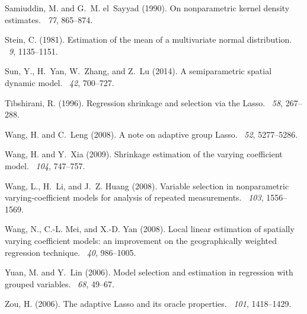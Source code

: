 \documentclass[authoryear,review, 12pt]{elsarticle}
\begin{document}
\begin{thebibliography}{}
Samiuddin, M. and G.~M. el~Sayyad (1990).
\newblock On nonparametric kernel density estimates.
~{\em 77}, 865--874.

Stein, C. (1981).
\newblock Estimation of the mean of a multivariate normal distribution.
~{\em 9}, 1135--1151.

Sun, Y., H.~Yan, W.~Zhang, and Z.~Lu (2014).
\newblock A semiparametric spatial dynamic model.
~{\em 42}, 700--727.

Tibshirani, R. (1996).
\newblock Regression shrinkage and selection via the {L}asso.
~{\em 58},
  267--288.

Wang, H. and C.~Leng (2008).
\newblock A note on adaptive group {L}asso.
~{\em 52},
  5277--5286.

Wang, H. and Y.~Xia (2009).
\newblock Shrinkage estimation of the varying coefficient model.
~{\em 104},
  747--757.

Wang, L., H.~Li, and J.~Z. Huang (2008).
\newblock Variable selection in nonparametric varying-coefficient models for
  analysis of repeated measurements.
~{\em 103},
  1556--1569.

Wang, N., C.-L. Mei, and X.-D. Yan (2008).
\newblock Local linear estimation of spatially varying coefficient models: an
  improvement on the geographically weighted regression technique.
~{\em 40}, 986--1005.

Yuan, M. and Y.~Lin (2006).
\newblock Model selection and estimation in regression with grouped variables.
~{\em 68},
  49--67.

Zou, H. (2006).
\newblock The adaptive {L}asso and its oracle properties.
~{\em 101},
  1418--1429.

\end{thebibliography}
\end{document}
